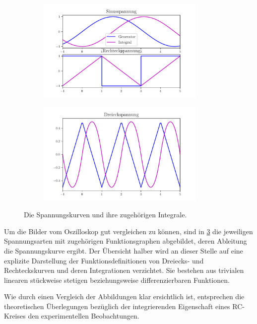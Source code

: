 \begin{figure}
\centering
\begin{subfigure}{0.48\textwidth}
    \centering
    \includegraphics[height=5cm]{plots/erwart_int1.pdf}
    \label{fig:erw1}
\end{subfigure}
\begin{subfigure}{0.48\textwidth}
    \centering
    \includegraphics[height=5cm]{plots/erwart_int2.pdf}
    \label{fig:erw2}
\end{subfigure}
\caption{Die Spannungskurven und ihre zugehörigen Integrale.}
\label{fig:int}
\end{figure}

Um die Bilder vom Oszilloskop gut vergleichen zu können, sind in \ref{fig:int}  
die jeweiligen Spannungsarten mit zugehörigen Funktionsgraphen abgebildet, deren Ableitung die Spannungskurve ergibt. 
Der Übersicht halber wird an dieser Stelle auf eine explizite Darstellung der Funktionsdefinitionen von Dreiecks- und Rechteckskurven 
und deren Integrationen verzichtet. Sie bestehen aus trivialen linearen stückweise stetigen beziehungsweise differenzierbaren 
Funktionen. 

Wie durch einen Vergleich der Abbildungen klar ersichtlich ist, entsprechen die theoretischen Überlegungen bezüglich der 
integrierenden Eigenschaft eines RC-Kreises den experimentellen Beobachtungen. 
